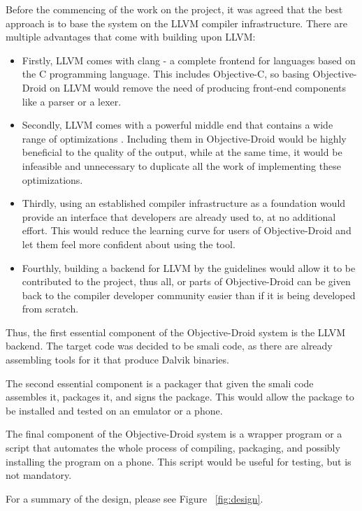 \documentclass[parskip]{cs4rep}
\begin{document}
Before the commencing of the work on the project, it was agreed that the best approach is to base the system on the LLVM compiler infrastructure. There are multiple advantages that come with building upon LLVM:
\begin{itemize}
\item
Firstly, LLVM comes with clang - a complete frontend for languages based on the C programming language. This includes Objective-C, so basing Objective-Droid on LLVM would remove the need of producing front-end components like a parser or a lexer.
\item
Secondly, LLVM comes with a powerful middle end that contains a wide range of optimizations \cite{P7}. Including them in Objective-Droid would be highly beneficial to the quality of the output, while at the same time, it would be infeasible and unnecessary to duplicate all the work of implementing these optimizations.
\item
Thirdly, using an established compiler infrastructure as a foundation would provide an interface that developers are already used to, at no additional effort. This would reduce the learning curve for users of Objective-Droid and let them feel more confident about using the tool.
\item
Fourthly, building a backend for LLVM by the guidelines would allow it to be contributed to the project, thus all, or parts of Objective-Droid can be given back to the compiler developer community easier than if it is being developed from scratch.
\end{itemize}
Thus, the first essential component of the Objective-Droid system is the LLVM backend. The target code was decided to be smali code, as there are already assembling tools for it that produce Dalvik binaries.

The second essential component is a packager that given the smali code assembles it, packages it, and signs the package. This would allow the package to be installed and tested on an emulator or a phone.

The final component of the Objective-Droid system is a wrapper program or a script that automates the whole process of compiling, packaging, and possibly installing the program on a phone. This script would be useful for testing, but is not mandatory.

For a summary of the design, please see Figure ~\ref{fig:design}.
\end{document}
